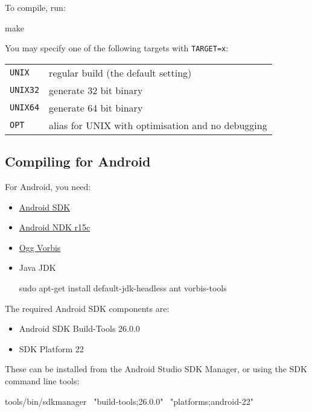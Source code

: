 To compile, run:

\begin{verbatim*}
make
\end{verbatim*}

You may specify one of the following targets with \texttt{TARGET=x}:

\begin{tabularx}{1.9\textwidth}{lX}

\texttt{UNIX} & regular build (the default setting) \\

\texttt{UNIX32} & generate 32 bit binary \\

\texttt{UNIX64} & generate 64 bit binary \\

\texttt{OPT} & alias for UNIX with optimisation and no debugging \\

\end{tabularx}

\subsection{Compiling for Android}

For Android, you need:

\begin{itemize}
\item \href{http://developer.android.com/sdk/}{Android SDK}
\item \href{http://developer.android.com/sdk/ndk/}{Android NDK r15c}
\item \href{http://www.vorbis.com/}{Ogg Vorbis}
\item {Java JDK 
\begin{verbatim*}
sudo apt-get install default-jdk-headless ant vorbis-tools
\end{verbatim*}}
\end{itemize}

The required Android SDK components are:
\begin{itemize}
\item Android SDK Build-Tools 26.0.0
\item SDK Platform 22
\end{itemize}
These can be installed from the Android Studio SDK Manager, or using the SDK
command line tools:

\begin{verbatim*}
tools/bin/sdkmanager \
  "build-tools;26.0.0" \
  "platforms;android-22"
\end{verbatim*}

